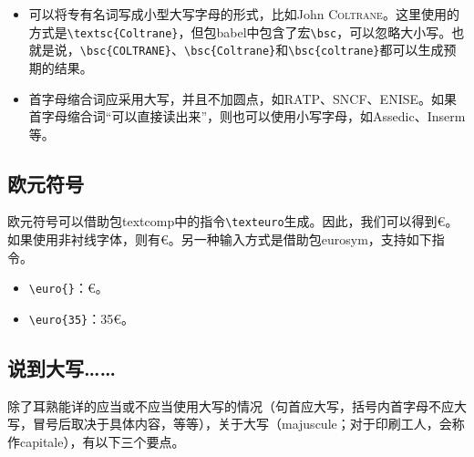 \begin{itemize}
\begin{codelist}[7.4]{
12\,345\,678,234\,34
}
\begin{verbatim}
\nombre{12345678,23434}
\end{verbatim}
\end{codelist}

    \item 可以将专有名词写成小型大写字母的形式，比如John \textsc{Coltrane}。这里使用的方式是\linebreak\verb|\textsc{Coltrane}|，但包\textsf{babel}中包含了宏\verb|\bsc|，可以忽略大小写。也就是说，\verb|\bsc{COLTRANE}|、\linebreak\verb|\bsc{Coltrane}|和\verb|\bsc{coltrane}|都可以生成预期的结果。
    
    \item 首字母缩合词应采用大写，并且不加圆点，如RATP、SNCF、ENISE。如果首字母缩合词“可以直接读出来”，则也可以使用小写字母，如Assedic、Inserm等。
\end{itemize}

\subsection{欧元符号}

欧元符号可以借助包\textsf{textcomp}中的指令\verb|\texteuro|生成。因此，我们可以得到€。如果使用非衬线字体，则有\textsf{€}。另一种输入方式是借助包\textsf{eurosym}，支持如下指令。

\begin{itemize}
    \item \verb|\euro{}|：€。
    \item \verb|\euro{35}|：35€。
\end{itemize}

\subsection{说到大写……}

除了耳熟能详的应当或不应当使用大写的情况（句首应大写，括号内首字母不应大写，冒号后取决于具体内容，等等），关于大写（majuscule；对于印刷工人，会称作capitale），有以下三个要点。

